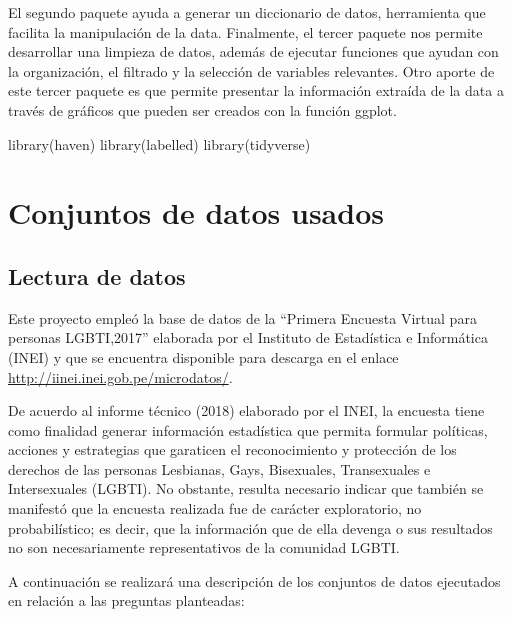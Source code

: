 \documentclass[
]{book}
\newenvironment{Shaded}{\begin{snugshade}}{\end{snugshade}}
\newcommand{\FunctionTok}[1]{\textcolor[rgb]{0.00,0.00,0.00}{#1}}
\newcommand{\NormalTok}[1]{#1}
\theoremstyle{definition}
\theoremstyle{definition}
\theoremstyle{definition}
\theoremstyle{definition}
\theoremstyle{remark}
\begin{document}
El segundo paquete ayuda a generar un diccionario de datos, herramienta que facilita la manipulación de la data. Finalmente, el tercer paquete nos permite desarrollar una limpieza de datos, además de ejecutar funciones que ayudan con la organización, el filtrado y la selección de variables relevantes. Otro aporte de este tercer paquete es que permite presentar la información extraída de la data a través de gráficos que pueden ser creados con la función ggplot.

\begin{Shaded}
\begin{Highlighting}[]
\FunctionTok{library}\NormalTok{(haven) }
\FunctionTok{library}\NormalTok{(labelled)}
\FunctionTok{library}\NormalTok{(tidyverse)}
\end{Highlighting}
\end{Shaded}

\hypertarget{conjuntos-de-datos-usados}{%
\section{Conjuntos de datos usados}\label{conjuntos-de-datos-usados}}

\hypertarget{lectura-de-datos}{%
\subsection{Lectura de datos}\label{lectura-de-datos}}

Este proyecto empleó la base de datos de la ``Primera Encuesta Virtual para personas LGBTI,2017'' elaborada por el Instituto de Estadística e Informática (INEI) y que se encuentra disponible para descarga en el enlace \url{http://iinei.inei.gob.pe/microdatos/}.

De acuerdo al informe técnico (2018) elaborado por el INEI, la encuesta tiene como finalidad generar información estadística que permita formular políticas, acciones y estrategias que garaticen el reconocimiento y protección de los derechos de las personas Lesbianas, Gays, Bisexuales, Transexuales e Intersexuales (LGBTI). No obstante, resulta necesario indicar que también se manifestó que la encuesta realizada fue de carácter exploratorio, no probabilístico; es decir, que la información que de ella devenga o sus resultados no son necesariamente representativos de la comunidad LGBTI.

A continuación se realizará una descripción de los conjuntos de datos ejecutados en relación a las preguntas planteadas:
\end{document}
